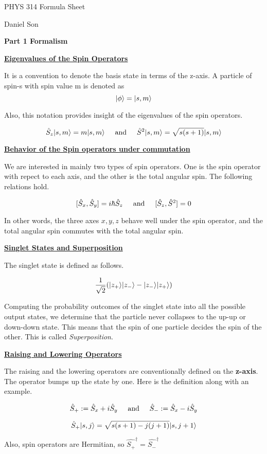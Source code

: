 \documentclass{article}
\DeclarePairedDelimiter\ket{\lvert}{\rangle}
\newcommand{\new}[1]{
    \vspace{2mm}
    \noindent
    \textbf{
    \underline{#1}}
}
\newcommand{\textAnd}{
    {
        \hspace{5mm}
        \textrm{and}
        \hspace{5mm}
    }
}
\begin{document}
\begin{center}
\LARGE
PHYS 314 Formula Sheet

\Large
Daniel Son
\end{center}


\LARGE
\noindent
\textbf{Part 1 Formalism}
\normalsize

\new{Eigenvalues of the Spin Operators}
It is a convention to denote the basis state in 
terms of the z-axis. A particle of spin-s with 
spin value m is denoted as 
\[
    \ket{\phi} = \ket{s, m}
\]

Also, this notation provides insight of the 
eigenvalues of the spin operators. 

\[
    \hat{S}_z\ket{s, m} = m \ket{s, m}
    \textAnd 
    \hat{S}^2\ket{s, m} = \sqrt{s(s+1)} \ket{s, m}
\]

\new{Behavior of the Spin operators under commutation}
We are interested in mainly two types of spin operators. 
One is the spin operator with repect to each axis, 
and the other is the total angular spin. The following 
relations hold. 

\[
    [\hat{S}_x, \hat{S}_y] = i\hbar \hat{S}_z
    \textAnd 
    [\hat{S}_z, \hat{S}^2] = 0
\]

In other words, the three axes $x, y, z$ behave well 
under the spin operator, and the total angular 
spin commutes with the total angular spin. 

\new{Singlet States and Superposition}

The singlet state is defined as follows.

\[
    \frac{1}{\sqrt{2}}
    (\ket{z_+}\ket{z_-} - \ket{z_-} \ket{z_+})
\]

Computing the probability outcomes of the singlet state 
into all the possible output states, we determine that 
the particle never collapses to the up-up or down-down state. 
This means that the spin of one particle decides the spin of the other. 
This is called \textit{Superposition}. 

\new{Raising and Lowering Operators}
The raising and the lowering operators are conventionally 
defined on the \textbf{z-axis}. The operator bumps up 
the state by one. Here is the definition along with an example. 

\[
    \hat{S}_+ := \hat{S}_x + i\hat{S}_y
    \textAnd 
    \hat{S}_- := \hat{S}_x - i\hat{S}_y
\]

\[
    \hat{S}_+ \ket{s, j} = 
    \sqrt{s(s + 1) - j(j + 1)}
    \ket{s, j + 1}
\]

Also, spin operators are Hermitian, so $\hat{S_+}^\dag = \hat{S_-}^\dag$
\end{document}
